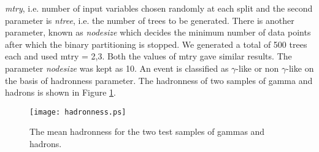 \documentclass[preprint,12pt]{elsarticle}
\begin{document}
\textit{mtry}, i.e. number of input variables chosen randomly at each split and the second parameter is \textit{ntree}, i.e. the number of trees 
to be generated.  There is another parameter, known as \textit{nodesize} which decides the minimum number of data points  after which the binary 
partitioning is stopped. We generated a total of 500 trees each and  used mtry = 2,3. Both the values of mtry gave similar results. The parameter 
\textit{nodesize} was kept as 10. An event is classified as $\gamma$-like or non $\gamma$-like on the basis of hadronness parameter. The hadronness 
of two samples of gamma and hadrons is shown in Figure \ref{Figure:hadronness}.
\begin{figure}[!h]
\begin{center}
\texttt{[image: hadronness.ps]}%
\caption{\label{Figure.} The mean hadronness for the two test samples of gammas and hadrons.}\label{Figure:hadronness}
\end{center}
\end{figure}

\end{document}
